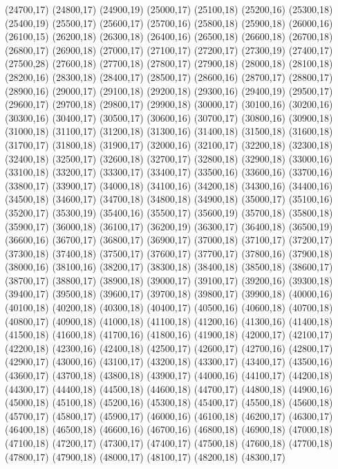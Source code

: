 (24700,17)
(24800,17)
(24900,19)
(25000,17)
(25100,18)
(25200,16)
(25300,18)
(25400,19)
(25500,17)
(25600,17)
(25700,16)
(25800,18)
(25900,18)
(26000,16)
(26100,15)
(26200,18)
(26300,18)
(26400,16)
(26500,18)
(26600,18)
(26700,18)
(26800,17)
(26900,18)
(27000,17)
(27100,17)
(27200,17)
(27300,19)
(27400,17)
(27500,28)
(27600,18)
(27700,18)
(27800,17)
(27900,18)
(28000,18)
(28100,18)
(28200,16)
(28300,18)
(28400,17)
(28500,17)
(28600,16)
(28700,17)
(28800,17)
(28900,16)
(29000,17)
(29100,18)
(29200,18)
(29300,16)
(29400,19)
(29500,17)
(29600,17)
(29700,18)
(29800,17)
(29900,18)
(30000,17)
(30100,16)
(30200,16)
(30300,16)
(30400,17)
(30500,17)
(30600,16)
(30700,17)
(30800,16)
(30900,18)
(31000,18)
(31100,17)
(31200,18)
(31300,16)
(31400,18)
(31500,18)
(31600,18)
(31700,17)
(31800,18)
(31900,17)
(32000,16)
(32100,17)
(32200,18)
(32300,18)
(32400,18)
(32500,17)
(32600,18)
(32700,17)
(32800,18)
(32900,18)
(33000,16)
(33100,18)
(33200,17)
(33300,17)
(33400,17)
(33500,16)
(33600,16)
(33700,16)
(33800,17)
(33900,17)
(34000,18)
(34100,16)
(34200,18)
(34300,16)
(34400,16)
(34500,18)
(34600,17)
(34700,18)
(34800,18)
(34900,18)
(35000,17)
(35100,16)
(35200,17)
(35300,19)
(35400,16)
(35500,17)
(35600,19)
(35700,18)
(35800,18)
(35900,17)
(36000,18)
(36100,17)
(36200,19)
(36300,17)
(36400,18)
(36500,19)
(36600,16)
(36700,17)
(36800,17)
(36900,17)
(37000,18)
(37100,17)
(37200,17)
(37300,18)
(37400,18)
(37500,17)
(37600,17)
(37700,17)
(37800,16)
(37900,18)
(38000,16)
(38100,16)
(38200,17)
(38300,18)
(38400,18)
(38500,18)
(38600,17)
(38700,17)
(38800,17)
(38900,18)
(39000,17)
(39100,17)
(39200,16)
(39300,18)
(39400,17)
(39500,18)
(39600,17)
(39700,18)
(39800,17)
(39900,18)
(40000,16)
(40100,18)
(40200,18)
(40300,18)
(40400,17)
(40500,16)
(40600,18)
(40700,18)
(40800,17)
(40900,18)
(41000,18)
(41100,18)
(41200,16)
(41300,16)
(41400,18)
(41500,18)
(41600,18)
(41700,16)
(41800,16)
(41900,18)
(42000,17)
(42100,17)
(42200,18)
(42300,16)
(42400,18)
(42500,17)
(42600,17)
(42700,16)
(42800,17)
(42900,17)
(43000,16)
(43100,17)
(43200,18)
(43300,17)
(43400,17)
(43500,16)
(43600,17)
(43700,18)
(43800,18)
(43900,17)
(44000,16)
(44100,17)
(44200,18)
(44300,17)
(44400,18)
(44500,18)
(44600,18)
(44700,17)
(44800,18)
(44900,16)
(45000,18)
(45100,18)
(45200,16)
(45300,18)
(45400,17)
(45500,18)
(45600,18)
(45700,17)
(45800,17)
(45900,17)
(46000,16)
(46100,18)
(46200,17)
(46300,17)
(46400,18)
(46500,18)
(46600,16)
(46700,16)
(46800,18)
(46900,18)
(47000,18)
(47100,18)
(47200,17)
(47300,17)
(47400,17)
(47500,18)
(47600,18)
(47700,18)
(47800,17)
(47900,18)
(48000,17)
(48100,17)
(48200,18)
(48300,17)
